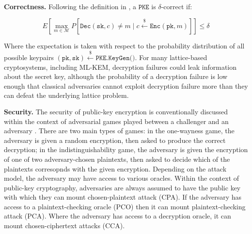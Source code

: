 \documentclass[journal=tches,submission]{iacrtrans}
\newcommand{\pke}{\texttt{PKE}}
\newcommand{\encrypt}{\texttt{Enc}}
\newcommand{\decrypt}{\texttt{Dec}}
\newcommand{\pk}{\texttt{pk}}
\newcommand{\sk}{\texttt{sk}}
\newcommand{\leftsample}{\stackrel{\$}{\leftarrow}}
\begin{document}
\textbf{Correctness.} Following the definition in \cite{DBLP:conf/eurocrypt/DworkNR04}, a $\pke$ is $\delta$-correct if:

\begin{equation*}
    E\left[\max_{m \in \mathcal{M}} P\left[\decrypt(\sk, c) \neq m \mid c \leftsample \encrypt(\pk, m)\right]\right] \leq \delta
\end{equation*}

Where the expectation is taken with respect to the probability distribution of all possible keypairs $(\pk, \sk) \leftsample \texttt{PKE.KeyGen()}$. For many lattice-based cryptosystems, including ML-KEM, decryption failures could leak information about the secret key, although the probability of a decryption failure is low enough that classical adversaries cannot exploit decryption failure more than they can defeat the underlying lattice problem.

\textbf{Security.} The security of public-key encryption is conventionally discussed within the context of adversarial games played between a challenger and an adversary \cite{DBLP:conf/stoc/GoldwasserM82}. There are two main types of games: in the one-wayness game, the adversary is given a random encryption, then asked to produce the correct decryption; in the indistinguishability game, the adversary is given the encryption of one of two adversary-chosen plaintexts, then asked to decide which of the plaintexts corresopnds with the given encryption. Depending on the attack model, the adversary may have access to various oracles. Within the context of public-key cryptography, adversaries are always assumed to have the public key with which they can mount chosen-plaintext attack (CPA). If the adversary has access to a plaintext-checking oracle (PCO) \cite{DBLP:conf/ctrsa/OkamotoP01} then it can mount plaintext-checking attack (PCA). Where the adversary has access to a decryption oracle, it can mount chosen-ciphertext attacks (CCA). 
\end{document}
